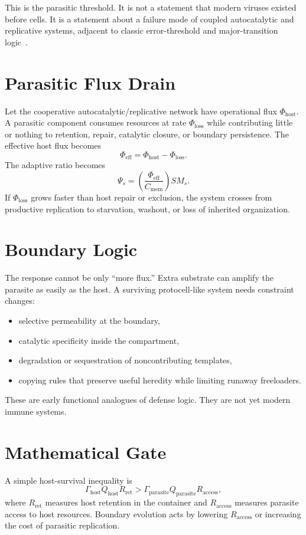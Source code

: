 \documentclass[11pt,a4paper]{article}
\begin{document}
This is the parasitic threshold. It is not a statement that modern viruses existed before cells. It is a statement about a failure mode of coupled autocatalytic and replicative systems, adjacent to classic error-threshold and major-transition logic~\cite{Eigen1971,MaynardSmith1997}.

\section{Parasitic Flux Drain}
Let the cooperative autocatalytic/replicative network have operational flux $\Phi_{\mathrm{host}}$. A parasitic component consumes resources at rate $\Phi_{\mathrm{loss}}$ while contributing little or nothing to retention, repair, catalytic closure, or boundary persistence. The effective host flux becomes
\begin{equation}
 \Phi_{\mathrm{eff}}=\Phi_{\mathrm{host}}-\Phi_{\mathrm{loss}}.
\end{equation}
The adaptive ratio becomes
\begin{equation}
 \Psi_s=
 \left(\frac{\Phi_{\mathrm{eff}}}{C_{\mathrm{mem}}}\right)S M_s.
\end{equation}
If $\Phi_{\mathrm{loss}}$ grows faster than host repair or exclusion, the system crosses from productive replication to starvation, washout, or loss of inherited organization.

\section{Boundary Logic}
The response cannot be only ``more flux.'' Extra substrate can amplify the parasite as easily as the host. A surviving protocell-like system needs constraint changes:
\begin{itemize}
 \item selective permeability at the boundary,
 \item catalytic specificity inside the compartment,
 \item degradation or sequestration of noncontributing templates,
 \item copying rules that preserve useful heredity while limiting runaway freeloaders.
\end{itemize}
These are early functional analogues of defense logic. They are not yet modern immune systems.

\section{Mathematical Gate}
A simple host-survival inequality is
\begin{equation}
\Gamma_{\mathrm{host}}Q_{\mathrm{host}}R_{\mathrm{ret}}
>
\Gamma_{\mathrm{parasite}}Q_{\mathrm{parasite}}R_{\mathrm{access}},
\end{equation}
where $R_{\mathrm{ret}}$ measures host retention in the container and $R_{\mathrm{access}}$ measures parasite access to host resources. Boundary evolution acts by lowering $R_{\mathrm{access}}$ or increasing the cost of parasitic replication.
\end{document}
